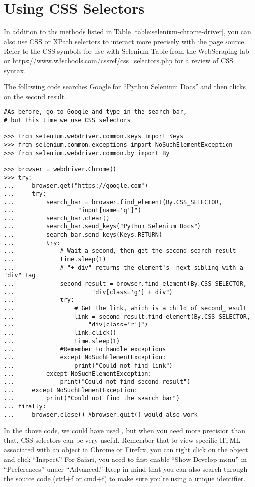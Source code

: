 \section*{Using CSS Selectors}%

In addition to the methods listed in Table \ref{table:selenium-chrome-driver}, you can also use CSS or XPath selectors to interact more precisely with the page source. Refer to the CSS symbols for use with Selenium Table from the WebScraping lab or \url{https://www.w3schools.com/cssref/css_selectors.php} for a review of CSS syntax.

The following code searches Google for ``Python Selenium Docs'' and then clicks on the second result.

\begin{lstlisting}
#As before, go to Google and type in the search bar,
# but this time we use CSS selectors

>>> from selenium.webdriver.common.keys import Keys
>>> from selenium.common.exceptions import NoSuchElementException
>>> from selenium.webdriver.common.by import By

>>> browser = webdriver.Chrome()
>>> try:
...		browser.get("https://google.com")
...		try:
...			search_bar = browser.find_element(By.CSS_SELECTOR,
...					 "input[name='q']")
...			search_bar.clear()
...			search_bar.send_keys("Python Selenium Docs")
...			search_bar.send_keys(Keys.RETURN)
...			try:
...				# Wait a second, then get the second search result
...				time.sleep(1)
...				# "+ div" returns the element's  next sibling with a "div" tag
...				second_result = browser.find_element(By.CSS_SELECTOR,
...						 "div[class='g'] + div")
...				try:
...					# Get the link, which is a child of second_result
...					link = second_result.find_element(By.CSS_SELECTOR, 
...						"div[class='r']")
...					link.click()
...					time.sleep(1)
...				#Remember to handle exceptions
...				except NoSuchElementException:
...					print("Could not find link")
...			except NoSuchElementException:
...				print("Could not find second result")
...		except NoSuchElementException:
...			print("Could not find the search bar")
...	finally:
...		browser.close() #browser.quit() would also work

\end{lstlisting}

In the above code, we could have used , but when you need more precision than that, CSS selectors can be very useful.
Remember that to view specific HTML associated with an object in Chrome or Firefox, you can right click on the object and click ``Inspect.''
For Safari, you need to first enable ``Show Develop menu'' in ``Preferences'' under ``Advanced.''
Keep in mind that you can also search through the source code (ctrl+f or cmd+f) to make sure you're using a unique identifier.

